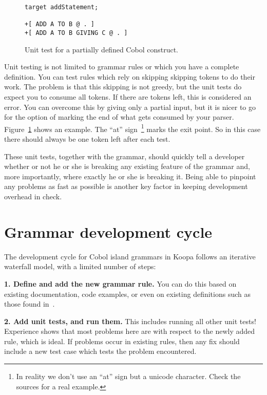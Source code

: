 \documentclass[a4paper]{article}
\begin{document}
\begin{figure}
\centering
\begin{lstlisting}
target addStatement;

+[ ADD A TO B @ . ]
+[ ADD A TO B GIVING C @ . ]
\end{lstlisting}
\caption{Unit test for a partially defined Cobol construct.}
\label{fig:koopa-test-with-marker}
\end{figure}

Unit testing is not limited to grammar rules or which you have a complete definition. You can test rules which rely on skipping skipping tokens to do their work. The problem is that this skipping is not greedy, but the unit tests do expect you to consume all tokens. If there are tokens left, this is considered an error. You can overcome this by giving only a partial input, but it is nicer to go for the option of marking the end of what gets consumed by your parser. Figure~\ref{fig:koopa-test-with-marker} shows an example. The ``at'' sign~\footnote{\scriptsize In reality we don't use an ``at'' sign but a unicode character. Check the sources for a real example.} marks the exit point. So in this case there should always be one token left after each test.

These unit tests, together with the grammar, should quickly tell a developer whether or not he or she is breaking any existing feature of the grammar and, more importantly, where exactly he or she is breaking it. Being able to pinpoint any problems as fast as possible is another key factor in keeping development overhead in check.


\section{Grammar development cycle}
\label{development-cycle}

The development cycle for Cobol island grammars in Koopa follows an iterative waterfall model, with a limited number of steps:

\textbf{1. Define and add the new grammar rule.} You can do this based on existing documentation, code examples, or even on existing definitions such as those found in~\cite{LV01-SPE}.

\textbf{2. Add unit tests, and run them.} This includes running all other unit tests! Experience shows that most problems here are with respect to the newly added rule, which is ideal. If problems occur in existing rules, then any fix should include a new test case which tests the problem encountered.
\end{document}
